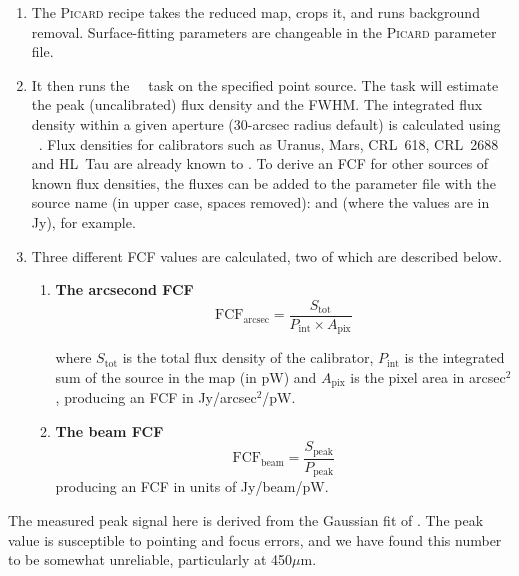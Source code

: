\documentclass[11pt,oneside,chapters]{starlink}
\begin{document}
\begin{enumerate}
\item{The \textsc{Picard} recipe  takes the reduced
map, crops it, and runs background removal. Surface-fitting
parameters are changeable in the \textsc{Picard} parameter file.}
\item{It then runs the \Kappa\ \beamfit\ task on the specified point
source. The  task will estimate the peak (uncalibrated)
flux density and the FWHM. The integrated flux density within a
given aperture (30-arcsec radius default) is calculated using
\photom\ \autophotom. Flux densities for calibrators such as Uranus,
Mars, CRL~618, CRL~2688 and HL~Tau are already known to
\picard. To derive an FCF for other sources of known flux densities,
the fluxes can be added to the parameter file with the source name
(in upper case, spaces removed): 
and  (where the values are in Jy),
for example.}

\item {Three different FCF values are calculated, two of which are
described below.}

\begin{enumerate}

\item\textbf{The arcsecond FCF} \begin{equation}
\label{eq:fcf_arcsec}
\mathrm{FCF_{arcsec}} = \frac{S_{\mathrm{tot}}}{P_{\mathrm{int}} \times
A_{\mathrm{pix}}}
\end{equation}

where $S_{\mathrm{tot}}$ is the total flux density of the calibrator,
$P_{\mathrm{int}}$ is the integrated sum of the source in the map (in
pW) and $A_{\mathrm{pix}}$ is the pixel area in arcsec$^2$, producing an
FCF in Jy/arcsec$^2$/pW.

\item\textbf{The beam FCF} \begin{equation}
\label{eq:fcf_beam}
\mathrm{FCF_{beam}} = \frac{S_{\mathrm{peak}}}{P_{\mathrm{peak}}}
\end{equation}
producing an FCF in units of Jy/beam/pW.
\end{enumerate}
\end{enumerate}

The measured peak signal here is derived from the Gaussian fit of
. The peak value is susceptible to pointing and focus errors,
and we have found this number to be somewhat unreliable, particularly
at 450$\mu$m.
\end{document}

